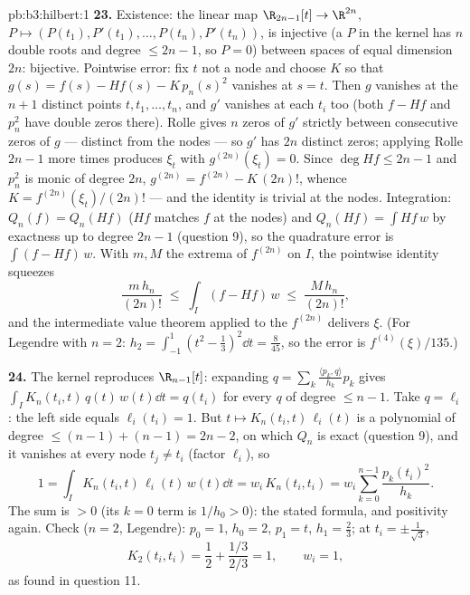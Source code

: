\begin{solution}{pb:b3:hilbert:1}
\textbf{23.} Existence: the linear map $\R_{2n-1}[t] \to
\R^{2n}$, $P \mapsto (P(t_1), P'(t_1), \dots, P(t_n),
P'(t_n))$, is injective (a $P$ in the kernel has $n$ double
roots and degree $\leq 2n - 1$, so $P = 0$) between spaces of
equal dimension $2n$: bijective. Pointwise error: fix $t$
not a node and choose $K$ so that $g(s) = f(s) - Hf(s) -
K\,p_n(s)^2$ vanishes at $s = t$. Then $g$ vanishes at the
$n + 1$ distinct points $t, t_1, \dots, t_n$, and $g'$
vanishes at each $t_i$ too (both $f - Hf$ and $p_n^2$ have
double zeros there). Rolle gives $n$ zeros of $g'$ strictly
between consecutive zeros of $g$ --- distinct from the nodes
--- so $g'$ has $2n$ distinct zeros; applying Rolle $2n - 1$
more times produces $\xi_t$ with $g^{(2n)}(\xi_t) = 0$.
Since $\deg Hf \leq 2n - 1$ and $p_n^2$ is monic of degree
$2n$, $g^{(2n)} = f^{(2n)} - K\,(2n)!$, whence $K =
f^{(2n)}(\xi_t)/(2n)!$ --- and the identity is trivial at
the nodes. Integration: $Q_n(f) = Q_n(Hf)$ ($Hf$ matches $f$
at the nodes) and $Q_n(Hf) = \int Hf\,w$ by exactness up to
degree $2n - 1$ (question 9), so the quadrature error is
$\int(f - Hf)\,w$. With $m, M$ the extrema of $f^{(2n)}$ on
$I$, the pointwise identity squeezes
\[
\frac{m\,h_n}{(2n)!} \;\leq\; \int_I(f - Hf)\,w
\;\leq\; \frac{M\,h_n}{(2n)!} ,
\]
and the intermediate value theorem applied to the 
$f^{(2n)}$ delivers $\xi$. (For Legendre with $n = 2$: $h_2
= \int_{-1}^1(t^2 - \frac13)^2\dd t = \frac8{45}$, so the
error is $f^{(4)}(\xi)/135$.)

\textbf{24.} The kernel reproduces $\R_{n-1}[t]$: expanding
$q = \sum_k\frac{\langle p_k, q\rangle}{h_k}p_k$ gives
$\int_I K_n(t_i, t)\,q(t)\,w(t)\dd t = q(t_i)$ for every
$q$ of degree $\leq n - 1$. Take $q = \ell_i$: the left side
equals $\ell_i(t_i) = 1$. But $t \mapsto K_n(t_i,
t)\,\ell_i(t)$ is a polynomial of degree $\leq (n - 1) + (n
- 1) = 2n - 2$, on which $Q_n$ is exact (question 9), and it
vanishes at every node $t_j \neq t_i$ (factor $\ell_i$), so
\[
1 = \int_I K_n(t_i, t)\,\ell_i(t)\,w(t)\dd t
= w_i\,K_n(t_i, t_i)
= w_i\sum_{k=0}^{n-1}\frac{p_k(t_i)^2}{h_k} .
\]
The sum is $> 0$ (its $k = 0$ term is $1/h_0 > 0$): the
stated formula, and positivity again. Check ($n = 2$,
Legendre): $p_0 = 1$, $h_0 = 2$, $p_1 = t$, $h_1 = \frac23$;
at $t_i = \pm\frac1{\sqrt3}$,
\[
K_2(t_i, t_i) = \frac12 + \frac{1/3}{2/3} = 1,
\qquad w_i = 1,
\]
as found in question 11.


\end{solution}
